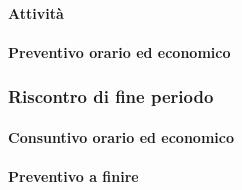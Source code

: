 \paragraph{Attività}

\paragraph{Preventivo orario ed economico}



\subsubsection{Riscontro di fine periodo}


\paragraph{Consuntivo orario ed economico}


\paragraph{Preventivo a finire}
